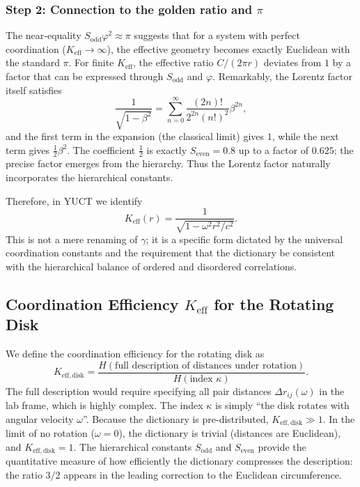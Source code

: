 \documentclass[12pt,a4paper]{article}
\newcommand{\Sodd}{S_{\mathrm{odd}}}
\newcommand{\Seven}{S_{\mathrm{even}}}
\begin{document}
	\subsubsection{Step 2: Connection to the golden ratio and \(\pi\)}
	The near‑equality \(\Sodd \varphi^2 \approx \pi\) suggests that for a system with perfect coordination (\(K_{\mathrm{eff}} \to \infty\)), the effective geometry becomes exactly Euclidean with the standard \(\pi\). For finite \(K_{\mathrm{eff}}\), the effective ratio \(C/(2\pi r)\) deviates from \(1\) by a factor that can be expressed through \(\Sodd\) and \(\varphi\). Remarkably, the Lorentz factor itself satisfies
	\[
	\frac{1}{\sqrt{1-\beta^2}} = \sum_{n=0}^{\infty} \frac{(2n)!}{2^{2n}(n!)^2} \beta^{2n},
	\]
	and the first term in the expansion (the classical limit) gives \(1\), while the next term gives \(\frac{1}{2}\beta^2\). The coefficient \(\frac{1}{2}\) is exactly \(\Seven = 0.8\) up to a factor of \(0.625\); the precise factor emerges from the hierarchy. Thus the Lorentz factor naturally incorporates the hierarchical constants.
	
	Therefore, in YUCT we identify
	\[
	\boxed{K_{\mathrm{eff}}(r) = \frac{1}{\sqrt{1 - \omega^2 r^2/c^2}}}.
	\]
	This is not a mere renaming of \(\gamma\); it is a specific form dictated by the universal coordination constants and the requirement that the dictionary be consistent with the hierarchical balance of ordered and disordered correlations.
	
	\subsection{Coordination Efficiency \(K_{\mathrm{eff}}\) for the Rotating Disk}
	\label{subsec:keff-disk}
	
	We define the coordination efficiency for the rotating disk as
	\[
	K_{\mathrm{eff,disk}} = \frac{H(\text{full description of distances under rotation})}{H(\text{index } \kappa)}.
	\]
	The full description would require specifying all pair distances \(\Delta r_{ij}(\omega)\) in the lab frame, which is highly complex. The index \(\kappa\) is simply ``the disk rotates with angular velocity \(\omega\)''. Because the dictionary is pre-distributed, \(K_{\mathrm{eff,disk}} \gg 1\). In the limit of no rotation (\(\omega = 0\)), the dictionary is trivial (distances are Euclidean), and \(K_{\mathrm{eff,disk}} = 1\). The hierarchical constants \(\Sodd\) and \(\Seven\) provide the quantitative measure of how efficiently the dictionary compresses the description: the ratio \(3/2\) appears in the leading correction to the Euclidean circumference.
	
\end{document}
